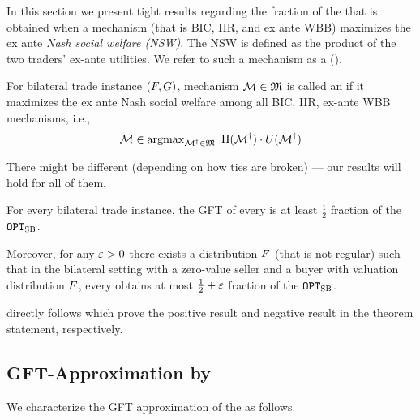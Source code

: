 
In this section we present tight results regarding the fraction of the {\SecondBest} that is obtained when a mechanism (that is  BIC, IIR, and ex ante WBB) maximizes the ex ante \emph{Nash social welfare (NSW)}. The NSW is defined as the product of the two traders' ex-ante utilities. We refer to such a mechanism as a \emph{\NashSocialWelfareMaximizer} ({\NSWM}).

\begin{definition}
    For bilateral trade instance $(F,G)$, mechanism $\mathcal{M}\in \mathfrak{M}$ is called an {\NashSocialWelfareMaximizer} if it maximizes the ex ante Nash social welfare among all BIC, IIR, ex-ante WBB mechanisms, i.e.,
    \begin{align*}
         \mathcal{M}
         \in \operatorname{argmax}\limits_{\mathcal{M}^\dagger\in\mathfrak{M}}~\Pi(\mathcal{M}^\dagger)\cdot U(\mathcal{M}^\dagger)
    \end{align*}
\end{definition}

There might be different {\NashSocialWelfareMaximizers} (depending on how ties are broken) --- our results will hold for all of them. 

\begin{theorem}
\label{thm:NSWM GFT}
For every bilateral trade instance, the GFT of every {\NashSocialWelfareMaximizer} is at least $\frac{1}{2}$ fraction of the {\SecondBest} $\texttt{OPT}_{\textsc{SB}}$.
    
Moreover, for any $\varepsilon>0$ there exists a distribution $F$ (that is not regular) such that in the bilateral setting with a zero-value seller and a buyer with valuation distribution $F$, every {\NashSocialWelfareMaximizer} obtains at most $\frac{1}{2}+\varepsilon$ fraction of the {\SecondBest} $\texttt{OPT}_{\textsc{SB}}$.
\end{theorem}

 directly follows  which prove the positive result and negative result in the theorem statement, respectively. 

\subsection{GFT-Approximation by {\NashSocialWelfareMaximizer}}

We characterize the GFT approximation of the {\NashSocialWelfareMaximizer} as follows.


